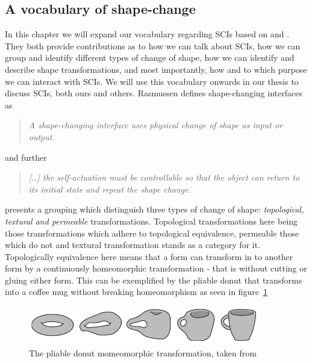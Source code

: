 \subsection{A vocabulary of shape-change}
In this chapter we will expand our vocabulary regarding SCIs based on \citet{coelho2011shape} and \citet{rasmussen2012shape}.
They both provide contributions as to how we can talk about SCIs, how we can group and identify different types of change of shape, how we can identify and describe shape transformations, and most importantly, how and to which purpose we can interact with SCIs.
We will use this vocabulary onwards in our thesis to discuss SCIs, both ours and others.   
Rasmussen defines shape-changing interfaces as
\begin{quotation}
\emph{A shape-changing interface uses physical change of shape as input or output.}
\end{quotation}
and further
\begin{quotation}
\emph{[\ldots] the self-actuation must be controllable so that the object can return to its initial state and repeat the shape change.}
\end{quotation}

\citeauthor{coelho2011shape} presents a grouping which distinguish three types of change of shape: \emph{topological, textural and permeable} transformations.
Topological transformations here being those transformations which adhere to topological equivalence, permeable those which do not and textural transformation stands as a category for it. Topologically equivalence here means that a form can transform in to another form by a continuously homeomorphic transformation - that is without cutting or gluing either form. This can be exemplified by the pliable donut that transforms into a coffee mug without breaking homeomorphism as seen in figure~\ref{pliable-mug}  

\begin{figure}[hb]
	\centering
  		\includegraphics[width=4in]{figures/pliable-donut}
	\caption[The pliable donut momeomorphic transformation, taken from \citep{coelho2011shape}]
   {The pliable donut momeomorphic transformation, taken from \citep{coelho2011shape}}
   \label{pliable-mug}
\end{figure}   
 
